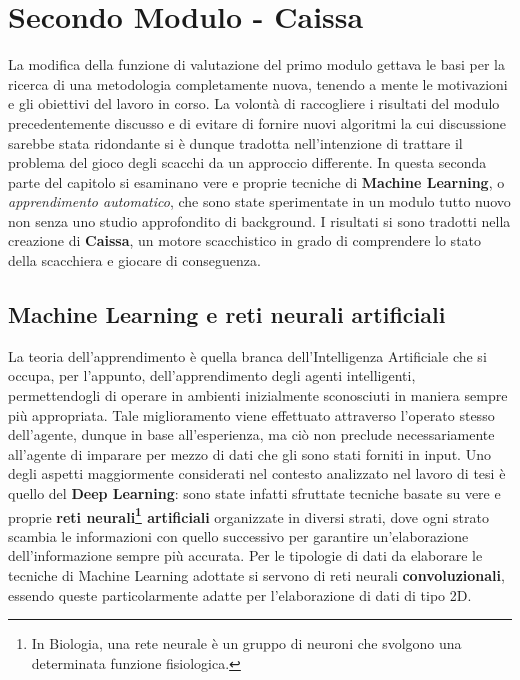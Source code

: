 \section{Secondo Modulo - Caissa}
La modifica della funzione di valutazione del primo modulo gettava le basi per la ricerca di una metodologia completamente nuova, tenendo a mente le motivazioni e gli obiettivi del lavoro in corso. La volontà di raccogliere i risultati del modulo precedentemente discusso e di evitare di fornire nuovi algoritmi la cui discussione sarebbe stata ridondante si è dunque tradotta nell'intenzione di trattare il problema del gioco degli scacchi da un approccio differente. In questa seconda parte del capitolo si esaminano vere e proprie tecniche di \textbf{Machine Learning}, o \textit{apprendimento automatico}, che sono state sperimentate in un modulo tutto nuovo non senza uno studio approfondito di background. I risultati si sono tradotti nella creazione di \textbf{Caissa}, un motore scacchistico in grado di comprendere lo stato della scacchiera e giocare di conseguenza.
\newpage
\subsection{Machine Learning e reti neurali artificiali}
La teoria dell'apprendimento è quella branca dell'Intelligenza Artificiale che si occupa, per l'appunto, dell'apprendimento degli agenti intelligenti, permettendogli di operare in ambienti inizialmente sconosciuti in maniera sempre più appropriata. Tale miglioramento viene effettuato attraverso l'operato stesso dell'agente, dunque in base all'esperienza, ma ciò non preclude necessariamente all'agente di imparare per mezzo di dati che gli sono stati forniti in input.
Uno degli aspetti maggiormente considerati nel contesto analizzato nel lavoro di tesi è quello del \textbf{Deep Learning}: sono state infatti sfruttate tecniche basate su vere e proprie \textbf{reti neurali\footnote{In Biologia, una rete neurale è un gruppo di neuroni che svolgono una determinata funzione fisiologica.} artificiali} organizzate in diversi strati, dove ogni strato scambia le informazioni con quello successivo per garantire un'elaborazione dell'informazione sempre più accurata. Per le tipologie di dati da elaborare le tecniche di Machine Learning adottate si servono di reti neurali \textbf{convoluzionali}, essendo queste particolarmente adatte per l'elaborazione di dati di tipo 2D.


